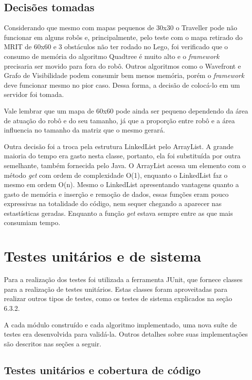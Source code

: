 \subsection{Decisões tomadas}

Considerando que mesmo com mapas pequenos de 30x30 o Traveller pode não funcionar em alguns robôs e, principalmente, pelo teste com o mapa retirado do MRIT de 60x60 e 3 obstáculos não ter rodado no Lego, foi verificado que o consumo de memória do algoritmo Quadtree é muito alto e o \textit{framework} precisaria ser movido para fora do robô. Outros algoritmos como o Wavefront e Grafo de Visibilidade podem consumir bem menos memória, porém o \textit{framework} deve funcionar mesmo no pior caso. Dessa forma, a decisão de colocá-lo em um servidor foi tomada.

Vale lembrar que um mapa de 60x60 pode ainda ser pequeno dependendo da área de atuação do robô e do seu tamanho, já que a proporção entre robô e a área influencia no tamanho da matriz que o mesmo gerará.

Outra decisão foi a troca pela estrutura LinkedList pelo ArrayList. A grande maioria do tempo era gasto nesta classe, portanto, ela foi substituída por outra semelhante, também fornecida pelo Java. O ArrayList acessa um elemento com o método \textit{get} com ordem de complexidade O(1), enquanto o LinkedList faz o mesmo em ordem O(n). Mesmo o LinkedList apresentando vantagens quanto a gasto de memória e inserção e remoção de dados, essas funções eram pouco expressivas na totalidade do código, nem sequer chegando a aparecer nas estastísticas geradas. Enquanto a função \textit{get} estava sempre entre as que mais consumiam tempo.

\section{Testes unitários e de sistema}

Para a realização dos testes foi utilizada a ferramenta JUnit, que fornece classes para a realização de testes unitários. Estas classes foram aproveitadas para realizar outros tipos de testes, como os testes de sistema explicados na seção 6.3.2.

A cada módulo construído e cada algoritmo implementado, uma nova suíte de testes era desenvolvida para validá-la. Outros detalhes sobre suas implementações são descritos nas seções a seguir.

\subsection{Testes unitários e cobertura de código}

